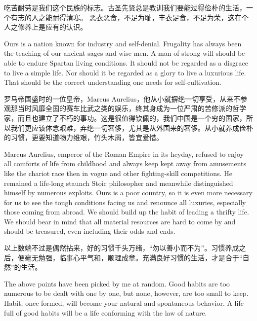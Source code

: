 { 吃苦耐劳是我们这个民族的标志。古圣先贤总是教训我们要能过得俭朴的生活，一个有志的人之能耐得清寒。
 恶衣恶食，不足为耻，丰衣足食，不足为荣，这在个人之修养上是应有的认识。
 
 Ours is a nation known for industry and self-denial. Frugality has always been the teaching of our ancient sages and wise men. A man of strong will should be able to endure Spartan living conditions. It should not be regarded as a disgrace to live a simple life. Nor should it be regarded as a glory to live a luxurious life. That should be the correct understanding one needs for self-cultivation. 
 
 罗马帝国盛时的一位皇帝，Marcus Aurelius，他从小就摒绝一切享受，从来不参观那当时风靡全国的赛车比武之类的娱乐，终其身成为一位严肃的苦修派的哲学家，而且也建立了不朽的事功。这是很值得钦佩的，我们中国是一个穷的国家，所以我们更应该体念艰难，弃绝一切奢侈，尤其是从外国来的奢侈。从小就养成俭朴的习惯，更要知道物力维艰，竹头木屑，皆宜爱惜。
 
 Marcus Aurelius, emperor of the Roman Empire in its heyday, refused to enjoy all comforts of life from childhood and always keep kept away from amusements like the chariot race then in vogue and other fighting-skill competitions. He remained a life-long staunch Stoic philosopher and meanwhile distinguished himself by numerous exploits. Ours is a poor country, so it is even more necessary for us to see the tough conditions facing us and renounce all luxuries, especially those coming from abroad. We should build up the habit of leading a thrifty life. We should bear in mind that all material resources are hard to come by and should be treasured, even including their odds and ends.
 
 以上数端不过是偶然拈来，好的习惯千头万绪，“勿以善小而不为”。习惯养成之后，便毫无勉强，临事心平气和，顺理成章。充满良好习惯的生活，才是合于“自然”的生活。
 
 The above points have been picked by me at random. Good habits are too numerous to be dealt with one by one, but none, however, are too small to keep. Habit, once formed, will become your natural and spontaneous behavior. A life full of good habits will be a life conforming with the law of nature.}